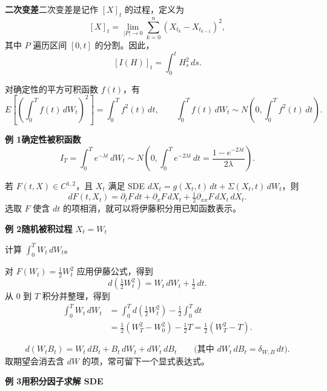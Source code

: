 \textbf{二次变差}\quad 二次变差是记作 $[X]_t$ 的过程，定义为
\[
  [X]_t=\lim_{|P|\to0}\sum_{k=0}^n(X_{t_k}-X_{t_{k-1}})^2,
\]
其中 $P$ 遍历区间 $[0,t]$ 的分割。因此，
\[
  [I(H)]_t=\int_0^t H_s^2\,ds.
\]



对确定性的平方可积函数 $f(t)$，有
\[
  E\left[\left(\int_0^T f(t)\,dW_t\right)^2\right]=\int_0^T f^2(t)\,dt,
  \qquad \int_0^T f(t)\,dW_t\sim N\left(0,\int_0^T f^2(t)\,dt\right).
\]

\textbf{例 1\quad 确定性被积函数}
\[
  I_T=\int_0^T e^{-\lambda t}\,dW_t
   \sim N\left(0,\int_0^T e^{-2\lambda t}\,dt
                   =\frac{1-e^{-2\lambda t}}{2\lambda}\right).
\]


若 $F(t,X)\in C^{1,2}$，且 $X_t$ 满足 SDE $dX_t=g(X_t,t)\,dt+\Sigma(X_t,t)\,dW_t$，则
\[
  dF(t,X_t)=\partial_tF\,dt+\partial_xF\,dX_t+\tfrac12\partial_{xx}F\,dX_t\,dX_t.
\]
选取 $F$ 使含 $dt$ 的项相消，就可以将伊藤积分用已知函数表示。

\textbf{例 2\quad 随机被积过程 $X_t=W_t$}

计算 $\int_0^T W_t\,dW_t$。

对 $F(W_t)=\tfrac12 W_t^2$ 应用伊藤公式，得到
\[
  d\left(\tfrac12 W_t^2\right)=W_t\,dW_t+\tfrac12\,dt.
\]
从 0 到 $T$ 积分并整理，得到
\[
  \begin{aligned}
    \int_0^T W_t\,dW_t
     &=\int_0^T d\left(\tfrac12 W_t^2\right)-\tfrac12\int_0^T dt\\
     &=\tfrac12(W_T^2-W_0^2)-\tfrac12 T=\tfrac12(W_T^2-T).
  \end{aligned}
\]


\[
  d(W_tB_t)=W_t\,dB_t+B_t\,dW_t+dW_t\,dB_t
      \qquad\bigl(\text{其中 }dW_t\,dB_t=\delta_{W,B}\,dt\bigr).
\]
取期望会消去含 $dW$ 的项，常可留下一个显式表达式。

\textbf{例 3\quad 用积分因子求解 SDE}

